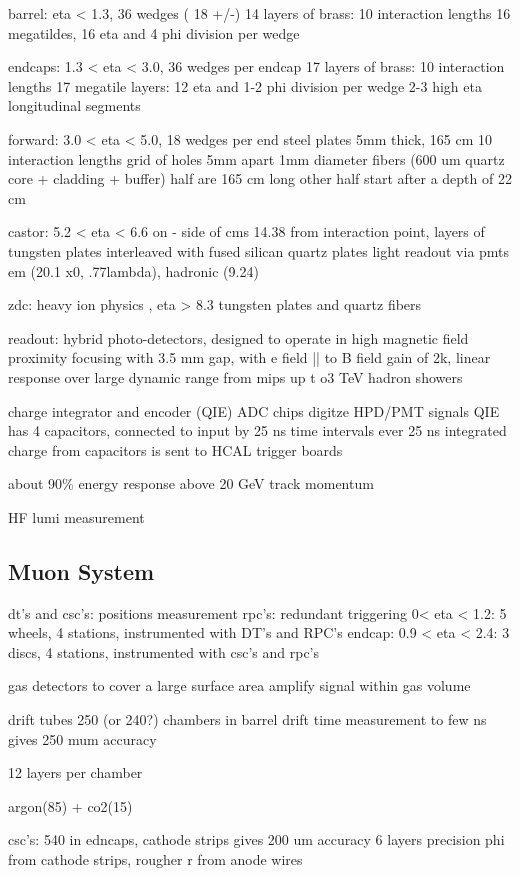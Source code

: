 \documentclass[oneside, letterpaper, oldfontcommands]{memoir}
\begin{document}
barrel: eta < 1.3, 36 wedges ( 18 +/-)
14 layers of brass: 10 interaction lengths
16 megatildes, 16 eta and 4 phi division per wedge

endcaps: 1.3 < eta < 3.0, 36 wedges per endcap
17 layers of brass: 10 interaction lengths
17 megatile layers: 12 eta and 1-2 phi division per wedge
2-3 high eta longitudinal segments

forward: 3.0 < eta < 5.0, 18 wedges per end
steel plates 5mm thick, 165 cm 10 interaction lengths
grid of holes 5mm apart
1mm diameter fibers (600 um quartz core + cladding + buffer)
half are 165 cm long
other half start after a depth of 22 cm

castor:
5.2 < eta < 6.6 on - side of cms 
14.38 from interaction point, layers of tungsten plates interleaved with fused silican quartz plates
light readout via pmts
em (20.1 x0, .77lambda), hadronic (9.24)

zdc:
heavy ion physics , eta > 8.3
tungsten plates and quartz fibers

readout: hybrid photo-detectors, designed to operate in high magnetic field
proximity focusing with 3.5 mm gap, with e field || to B field
gain of 2k, linear response over large dynamic range from mips up t o3 TeV hadron showers

charge integrator and encoder (QIE) ADC chips digitze HPD/PMT signals
QIE has 4 capacitors, connected to input by 25 ns time intervals
ever 25 ns integrated charge from capacitors is sent to HCAL trigger boards

about 90\% energy response above 20 GeV track momentum



HF lumi measurement
\subsection{Muon System}\label{muonsys}
dt's and csc's: positions measurement
rpc's: redundant triggering
0< eta < 1.2: 5 wheels, 4 stations, instrumented with DT's and RPC's
endcap: 0.9 < eta < 2.4: 3 discs, 4 stations, instrumented with csc's and rpc's

gas detectors to cover a large surface area
amplify signal within gas volume

drift tubes
250 (or 240?) chambers in barrel
drift time measurement to few ns gives 250 mum accuracy

12 layers per chamber

argon(85) + co2(15)

csc's: 540 in edncaps, cathode strips gives 200 um accuracy
6 layers
precision phi from cathode strips, rougher r from anode wires
\end{document}
